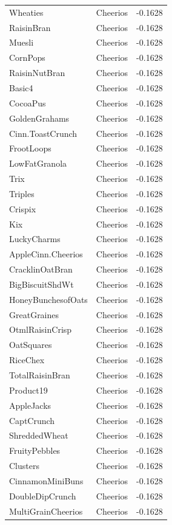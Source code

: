\begin{table}[!htbp]
\begin{tabular}{lll}
\\
Wheaties & Cheerios & -0.1628
\\
RaisinBran & Cheerios & -0.1628
\\
Muesli & Cheerios & -0.1628
\\
CornPops & Cheerios & -0.1628
\\
RaisinNutBran & Cheerios & -0.1628
\\
Basic4 & Cheerios & -0.1628
\\
CocoaPus & Cheerios & -0.1628
\\
GoldenGrahams & Cheerios & -0.1628
\\
Cinn.ToastCrunch & Cheerios & -0.1628
\\
FrootLoops & Cheerios & -0.1628
\\
LowFatGranola & Cheerios & -0.1628
\\
Trix & Cheerios & -0.1628
\\
Triples & Cheerios & -0.1628
\\
Crispix & Cheerios & -0.1628
\\
Kix & Cheerios & -0.1628
\\
LuckyCharms & Cheerios & -0.1628
\\
AppleCinn.Cheerios & Cheerios & -0.1628
\\
CracklinOatBran & Cheerios & -0.1628
\\
BigBiscuitShdWt & Cheerios & -0.1628
\\
HoneyBunchesofOats & Cheerios & -0.1628
\\
GreatGraines & Cheerios & -0.1628
\\
OtmlRaisinCrisp & Cheerios & -0.1628
\\
OatSquares & Cheerios & -0.1628
\\
RiceChex & Cheerios & -0.1628
\\
TotalRaisinBran & Cheerios & -0.1628
\\
Product19 & Cheerios & -0.1628
\\
AppleJacks & Cheerios & -0.1628
\\
CaptCrunch & Cheerios & -0.1628
\\
ShreddedWheat & Cheerios & -0.1628
\\
FruityPebbles & Cheerios & -0.1628
\\
Clusters & Cheerios & -0.1628
\\
CinnamonMiniBuns & Cheerios & -0.1628
\\
DoubleDipCrunch & Cheerios & -0.1628
\\
MultiGrainCheerios & Cheerios & -0.1628
\\

\end{tabular}
\end{table}
